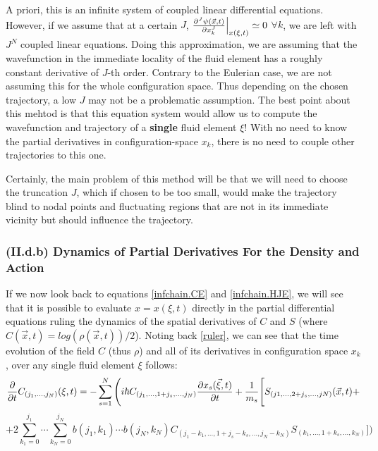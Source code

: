 \documentclass[11pt, a4paper]{article} %
\begin{document}
A priori, this is an infinite system of coupled linear differential equations. However, if we assume that at a certain $J$, $\pdv[J]{\psi(\vec{x},t)}{x_k}\Big\rvert_{x(\xi,t)}\simeq 0$  $\forall k$, we are left with $J^N$ coupled linear equations. Doing this approximation, we are assuming that the wavefunction in the immediate locality of the fluid element has a roughly constant derivative of $J$-th order. Contrary to the Eulerian case, we are not assuming this for the whole configuration space. Thus depending on the chosen trajectory, a low $J$ may not be a problematic assumption. The best point about this mehtod is that this equation system would allow us to compute the wavefunction and trajectory of a {\bf single} fluid element $\xi$! With no need to know the partial derivatives in configuration-space $x_k$, there is no need to couple other trajectories to this one.

Certainly, the main problem of this method will be that we will need to choose the truncation $J$, which if chosen to be too small, would make the trajectory blind to nodal points and fluctuating regions that are not in its immediate vicinity but should influence the trajectory.\vspace{-0.1cm}

\subsubsection*{(II.d.b) Dynamics of Partial Derivatives For the Density and Action}\vspace{-0.1cm}

If we now look back to equations \eqref{infchain.CE} and \eqref{infchain.HJE}, we will see that it is possible to evaluate $x=x(\xi,t)$ directly in the partial differential equations ruling the dynamics of the spatial derivatives of $C$ and $S$ (where $C(\vec{x},t)=log(\rho(\vec{x},t))/2$). Noting back \eqref{ruler}, we can see that the time evolution of the field $C$ (thus $\rho$) and all of its derivatives in configuration space $x_k$, over any single fluid element $\xi$ follows:\vspace{-0.1cm}
\begin{equation}\label{infchain.CE.L}
\pdv{}{t}C_{(j_1,...,j_N)}(\xi,t)=-\sum_{s=1}^N \Bigg(i\hbar C_{(j_1,...,1+j_s,...,j_N)}\pdv{x_s(\vec{\xi},t)}{t} + \frac{1}{m_s} \Bigg[S_{(j1,...,2+j_s,...,jN)}(\vec{x},t)+
\end{equation}
$$
+2 \sum_{k_1=0}^{j_1}\cdots\sum_{k_N=0}^{j_N} b(j_1,k_1)\cdots b(j_N,k_N)C_{(j_1-k_1,...,1+j_s-k_s,...,j_N-k_N)}S_{(k_1,...,1+k_s,...,k_N)} \Bigg]\bigg)
$$
\end{document}
